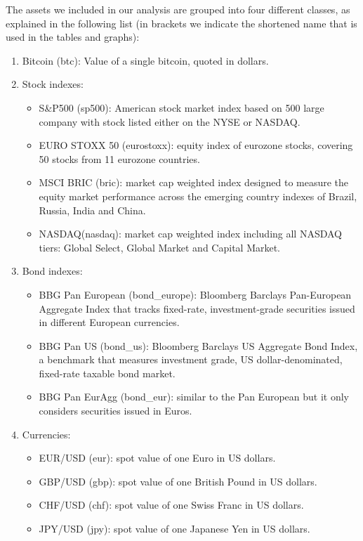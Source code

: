 The assets we included in our analysis are grouped into four different classes, as explained in the following list (in brackets we indicate the shortened name that is used in the tables and graphs):

\begin{enumerate}
	\item Bitcoin (btc): Value of a single bitcoin, quoted in dollars.
	\bigskip
	\item Stock indexes:
	\begin{itemize}
		\item S\&P500 (sp500): American stock market index based on 500 large company with stock listed either on the NYSE or NASDAQ.
		\item EURO STOXX 50 (eurostoxx): equity index of eurozone stocks, covering 50 stocks from 11 eurozone countries.
		\item MSCI BRIC (bric): market cap weighted index designed to measure the equity market performance across the emerging country indexes of Brazil, Russia, India and China.
		\item NASDAQ(nasdaq): market cap weighted index including all NASDAQ tiers: Global Select, Global Market and Capital Market.
	\end{itemize}
	\item Bond indexes:
	\begin{itemize}
		\item BBG Pan European (bond\_europe): Bloomberg Barclays Pan-European Aggregate Index that tracks fixed-rate, investment-grade securities issued in different European currencies.
		\item BBG Pan US (bond\_us): Bloomberg Barclays US Aggregate Bond Index, a benchmark that measures investment grade, US dollar-denominated, fixed-rate taxable bond market.
		\item BBG Pan EurAgg (bond\_eur): similar to the Pan European but it only considers securities issued in Euros.
	\end{itemize} 
	\item Currencies:
	\begin{itemize}
		\item EUR/USD (eur): spot value of one Euro in  US dollars. 
		\item GBP/USD (gbp): spot value of one British Pound in US dollars.
		\item CHF/USD (chf): spot value of one Swiss Franc in  US dollars.
		\item JPY/USD (jpy): spot value of one Japanese Yen in  US dollars.

\end{itemize}
\end{enumerate}
